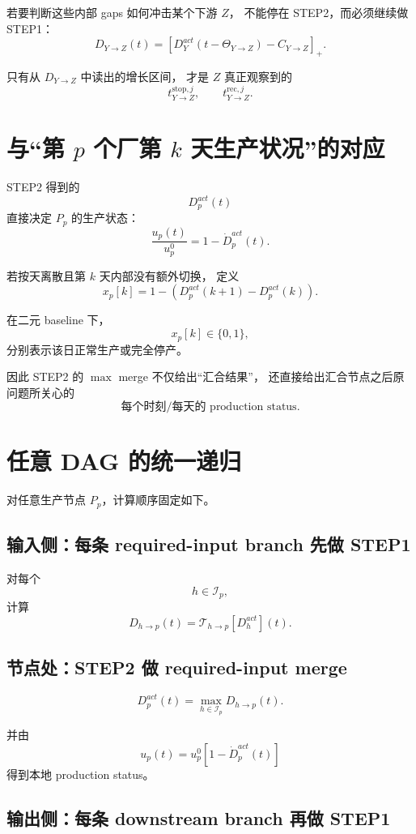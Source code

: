 \documentclass[UTF8,11pt]{ctexart}
\begin{document}
若要判断这些内部 gaps 如何冲击某个下游 \(Z\)，
不能停在 STEP2，而必须继续做 STEP1：
\[
\boxed{
D_{Y\to Z}(t)
=
\left[
D_Y^{act}(t-\Theta_{Y\to Z})
-C_{Y\to Z}
\right]_+.
}
\tag{26}
\]

只有从 \(D_{Y\to Z}\) 中读出的增长区间，
才是 \(Z\) 真正观察到的
\[
t_{Y\to Z}^{\mathrm{stop},j},
\qquad
t_{Y\to Z}^{\mathrm{rec},j}.
\]

\section{与“第 \(p\) 个厂第 \(k\) 天生产状况”的对应}

STEP2 得到的
\[
D_p^{act}(t)
\]
直接决定 \(P_p\) 的生产状态：
\[
\boxed{
\frac{u_p(t)}{u_p^0}
=
1-\dot D_p^{act}(t).
}
\tag{27}
\]

若按天离散且第 \(k\) 天内部没有额外切换，
定义
\[
\boxed{
x_p[k]
=
1-
\left(
D_p^{act}(k+1)-D_p^{act}(k)
\right).
}
\tag{28}
\]

在二元 baseline 下，
\[
x_p[k]\in\{0,1\},
\]
分别表示该日正常生产或完全停产。

因此 STEP2 的 \(\max\) merge
不仅给出“汇合结果”，
还直接给出汇合节点之后原问题所关心的
\[
\boxed{\text{每个时刻/每天的 production status}.}
\]

\section{任意 DAG 的统一递归}

对任意生产节点 \(P_p\)，计算顺序固定如下。

\subsection*{输入侧：每条 required-input branch 先做 STEP1}

对每个
\[
h\in\mathcal I_p,
\]
计算
\[
\boxed{
D_{h\to p}(t)
=
\mathcal T_{h\to p}[D_h^{act}](t).
}
\tag{29}
\]

\subsection*{节点处：STEP2 做 required-input merge}

\[
\boxed{
D_p^{act}(t)
=
\max_{h\in\mathcal I_p}
D_{h\to p}(t).
}
\tag{30}
\]

并由
\[
\boxed{
u_p(t)
=
u_p^0
[1-\dot D_p^{act}(t)]
}
\tag{31}
\]
得到本地 production status。

\subsection*{输出侧：每条 downstream branch 再做 STEP1}
\end{document}
